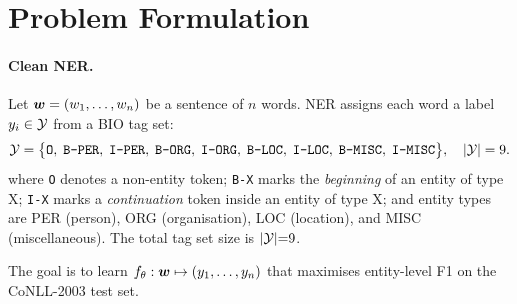 \section{Problem Formulation}
\label{sec:problem}

\paragraph{Clean NER.}
Let $\bm{w} = (w_1, \ldots, w_n)$ be a sentence of $n$ words.  NER assigns each
word a label $y_i \in \mathcal{Y}$ from a BIO tag set:
\[
  \mathcal{Y} = \bigl\{
    \texttt{O},\;
    \texttt{B-PER},\;\texttt{I-PER},\;
    \texttt{B-ORG},\;\texttt{I-ORG},\;
    \texttt{B-LOC},\;\texttt{I-LOC},\;
    \texttt{B-MISC},\;\texttt{I-MISC}
  \bigr\},
  \quad |\mathcal{Y}| = 9.
\]
\noindent where \texttt{O} denotes a non-entity token; \texttt{B-X} marks the \emph{beginning} of an entity of type X; \texttt{I-X} marks a \emph{continuation} token inside an entity of type X; and entity types are PER (person), ORG (organisation), LOC (location), and MISC (miscellaneous). The total tag set size is $|\mathcal{Y}|{=}9$.

The goal is to learn $f_\theta : \bm{w} \mapsto (y_1,\ldots,y_n)$ that maximises
entity-level F1 on the CoNLL-2003 test set.

